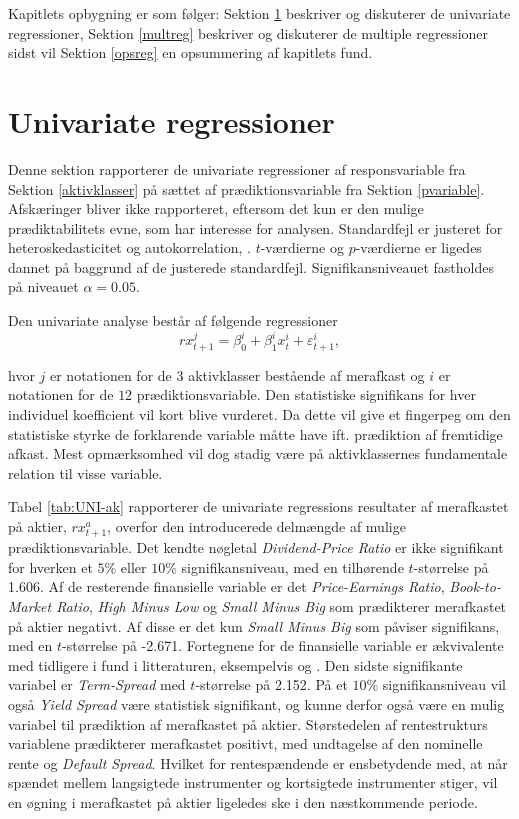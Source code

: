 \documentclass[
  a4paper,
  oneside]{memoir}
\begin{document}
Kapitlets opbygning er som følger: Sektion \ref{unireg} beskriver og diskuterer de univariate regressioner, Sektion \ref{multreg} beskriver og diskuterer de multiple regressioner sidst vil Sektion \ref{opsreg} en opsummering af kapitlets fund.

\hypertarget{unireg}{%
\section{Univariate regressioner}\label{unireg}}

Denne sektion rapporterer de univariate regressioner af responsvariable fra Sektion \ref{aktivklasser} på sættet af prædiktionsvariable fra Sektion \ref{pvariable}. Afskæringer bliver ikke rapporteret, eftersom det kun er den mulige prædiktabilitets evne, som har interesse for analysen. Standardfejl er justeret for heteroskedasticitet og autokorrelation, \citep{Newey1987}. \(t\)-værdierne og \(p\)-værdierne er ligedes dannet på baggrund af de justerede standardfejl. Signifikansniveauet fastholdes på niveauet \(\alpha=0.05\).

Den univariate analyse består af følgende regressioner
\[rx_{t+1}^j=\beta_{0}^i+\beta_{1}^ix_{t}^i+\varepsilon_{t+1}^i,\]

hvor \(j\) er notationen for de \(3\) aktivklasser bestående af merafkast og \(i\) er notationen for de \(12\) prædiktionsvariable. Den statistiske signifikans for hver individuel koefficient vil kort blive vurderet. Da dette vil give et fingerpeg om den statistiske styrke de forklarende variable måtte have ift. prædiktion af fremtidige afkast. Mest opmærksomhed vil dog stadig være på aktivklassernes fundamentale relation til visse variable.

Tabel \ref{tab:UNI-ak} rapporterer de univariate regressions resultater af merafkastet på aktier, \(rx_{t+1}^a\), overfor den introducerede delmængde af mulige prædiktionsvariable. Det kendte nøgletal \emph{Dividend-Price Ratio} er ikke signifikant for hverken et \(5\%\) eller \(10\%\) signifikansniveau, med en tilhørende \(t\)-størrelse på 1.606. Af de resterende finansielle variable er det \emph{Price-Earnings Ratio}, \emph{Book-to-Market Ratio}, \emph{High Minus Low} og \emph{Small Minus Big} som prædikterer merafkastet på aktier negativt. Af disse er det kun \emph{Small Minus Big} som påviser signifikans, med en \(t\)-størrelse på -2.671. Fortegnene for de finansielle variable er ækvivalente med tidligere i fund i litteraturen, eksempelvis \citep{Camp1987} og \citep{CampVicCha2003}. Den sidste signifikante variabel er \emph{Term-Spread} med \(t\)-størrelse på 2.152. På et \(10\%\) signifikansniveau vil også \emph{Yield Spread} være statistisk signifikant, og kunne derfor også være en mulig variabel til prædiktion af merafkastet på aktier. Størstedelen af rentestrukturs variablene prædikterer merafkastet positivt, med undtagelse af den nominelle rente og \emph{Default Spread}. Hvilket for rentespændende er ensbetydende med, at når spændet mellem langsigtede instrumenter og kortsigtede instrumenter stiger, vil en øgning i merafkastet på aktier ligeledes ske i den næstkommende periode.
\end{document}
